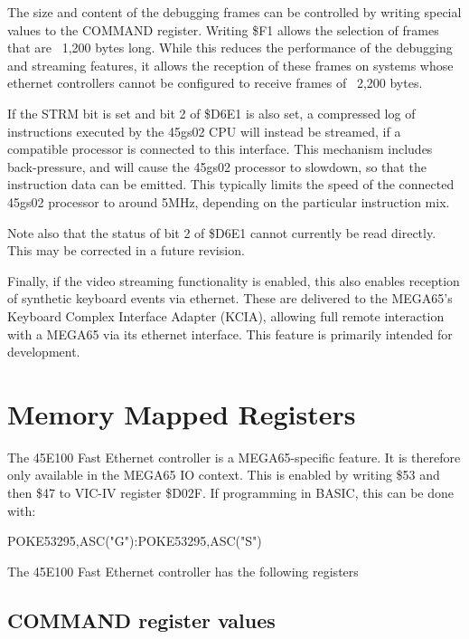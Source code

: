The size and content of the debugging frames can be controlled by writing special values to the
COMMAND register.  Writing \$F1 allows the selection of frames that are ~1,200 bytes long.
While this reduces the performance of the debugging and streaming features, it allows the reception
of these frames on systems whose ethernet controllers cannot be configured to receive frames
of ~2,200 bytes.

If the STRM bit is set and bit 2 of \$D6E1 is also set, a compressed log of instructions executed by
the 45gs02 CPU will instead be streamed, if a compatible processor is connected to this interface.
This mechanism includes back-pressure, and will cause the 45gs02 processor to slowdown,
so that the instruction data can be emitted.  This typically limits the speed of the connected
45gs02 processor to around 5MHz, depending on the particular instruction mix.

Note also that
the status of bit 2 of \$D6E1 cannot currently be read directly. This may be corrected in a future
revision.

Finally, if the video streaming functionality is enabled, this also enables reception of synthetic
keyboard events via ethernet.  These are delivered to the MEGA65's Keyboard Complex Interface Adapter
(KCIA), allowing full remote interaction with a MEGA65 via its ethernet interface.  This feature is
primarily intended for development.

\section{Memory Mapped Registers}

The 45E100 Fast Ethernet controller is a MEGA65-specific feature.
It is therefore only available in the MEGA65 IO context.
This is enabled by writing \$53 and then \$47 to VIC-IV register \$D02F.
If programming in BASIC, this can be done with:

\begin{screenoutput}
POKE53295,ASC("G"):POKE53295,ASC("S")
\end{screenoutput}

The 45E100 Fast Ethernet controller has the following registers



\subsection{COMMAND register values}

